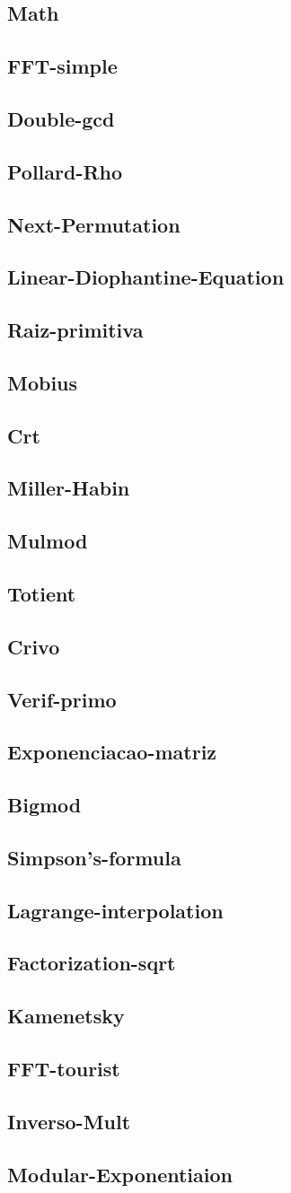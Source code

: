 \documentclass{article}
\newcommand\includes[2]{ %
   \subsection{#1}
   
}
\begin{document}
\begin{multicols}{2}
\section{Math}
\includes{FFT-simple}{C++/Math/FFT-simple.cpp}
\includes{Double-gcd}{C++/Math/Double-gcd.cpp}
\includes{Pollard-Rho}{C++/Math/Pollard-Rho.cpp}
\includes{Next-Permutation}{C++/Math/Next-Permutation.cpp}
\includes{Linear-Diophantine-Equation}{C++/Math/Linear-Diophantine-Equation.cpp}
\includes{Raiz-primitiva}{C++/Math/Raiz-primitiva.cpp}
\includes{Mobius}{C++/Math/Mobius.cpp}
\includes{Crt}{C++/Math/Crt.cpp}
\includes{Miller-Habin}{C++/Math/Miller-Habin.cpp}
\includes{Mulmod}{C++/Math/Mulmod.cpp}
\includes{Totient}{C++/Math/Totient.cpp}
\includes{Crivo}{C++/Math/Crivo.cpp}
\includes{Verif-primo}{C++/Math/Verif-primo.cpp}
\includes{Exponenciacao-matriz}{C++/Math/Exponenciacao-matriz.cpp}
\includes{Bigmod}{C++/Math/Bigmod.cpp}
\includes{Simpson's-formula}{C++/Math/Simpson's-formula.cpp}
\includes{Lagrange-interpolation}{C++/Math/Lagrange-interpolation.cpp}
\includes{Factorization-sqrt}{C++/Math/Factorization-sqrt.cpp}
\includes{Kamenetsky}{C++/Math/Kamenetsky.cpp}
\includes{FFT-tourist}{C++/Math/FFT-tourist.cpp}
\includes{Inverso-Mult}{C++/Math/Inverso-Mult.cpp}
\includes{Modular-Exponentiaion}{C++/Math/Modular-Exponentiaion.cpp}

\end{multicols}
\end{document}
